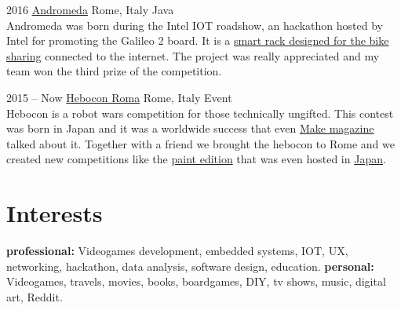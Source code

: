 \documentclass[]{friggeri-cv} %
\begin{document}
\begin{entrylist}
\entry
{2016}
{\href{http://jaegerbox.net/third-prize-intel-iot-roadshow-andromeda/}{Andromeda}}
{Rome, Italy}
{Java\\
	Andromeda was born during the Intel IOT roadshow, an hackathon hosted by Intel for promoting the Galileo 2 board. It is a \href{https://youtu.be/BzG7xg5_9JM}{smart rack designed for the bike sharing} connected to the internet. The project was really appreciated and my team won the third prize of the competition. 
}

\entry
{2015 -- Now}
{\href{https://www.facebook.com/HeboconRoma/}{Hebocon Roma}}
{Rome, Italy}
{Event\\
	Hebocon is a robot wars competition for those technically ungifted. This contest was born in Japan and it was a worldwide success that even \href{https://makezine.com/2017/05/08/hebocon-crappy-robot-competition/}{Make magazine} talked about it. Together with a friend we brought the hebocon to Rome and we created new competitions like the \href{https://www.youtube.com/watch?v=SF5oQEZsgzA}{paint edition} that  was even hosted in \href{http://portal.nifty.com/kiji/161011197795_1.htm}{Japan}.
}


\end{entrylist}




\section{Interests}

\textbf{professional:} Videogames development, embedded systems, IOT, UX, networking, hackathon, data analysis, software design, education. \textbf{personal:} Videogames, travels, movies, books, boardgames, DIY, tv shows, music, digital art, Reddit.
\end{document}

